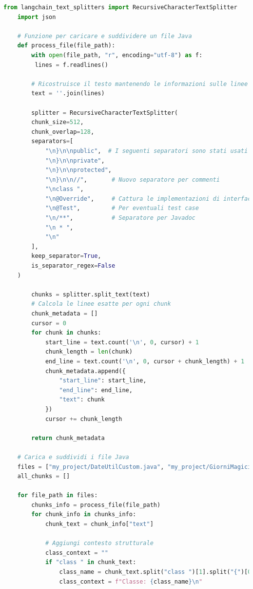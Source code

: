 \documentclass[12pt,a4paper,openright,twoside]{book}
\begin{document}
\begin{lstlisting}[language=Python, caption={Codice Python per la suddivisione dei file Java in chunk}, label={lst:chunking}]
    from langchain_text_splitters import RecursiveCharacterTextSplitter
    import json
    
    # Funzione per caricare e suddividere un file Java
    def process_file(file_path):
        with open(file_path, "r", encoding="utf-8") as f:
         lines = f.readlines()
    
        # Ricostruisce il testo mantenendo le informazioni sulle linee
        text = ''.join(lines)
    
        splitter = RecursiveCharacterTextSplitter(
        chunk_size=512,
        chunk_overlap=128,
        separators=[
            "\n}\n\npublic",  # I seguenti separatori sono stati usati per provare a mantenere i metodi uniti
            "\n}\n\nprivate",
            "\n}\n\nprotected",
            "\n}\n\n//",       # Nuovo separatore per commenti
            "\nclass ",
            "\n@Override",     # Cattura le implementazioni di interfacce
            "\n@Test",         # Per eventuali test case
            "\n/**",           # Separatore per Javadoc
            "\n * ",
            "\n"
        ],
        keep_separator=True,
        is_separator_regex=False
    )
    
        chunks = splitter.split_text(text)
        # Calcola le linee esatte per ogni chunk
        chunk_metadata = []
        cursor = 0
        for chunk in chunks:
            start_line = text.count('\n', 0, cursor) + 1
            chunk_length = len(chunk)
            end_line = text.count('\n', 0, cursor + chunk_length) + 1
            chunk_metadata.append({
                "start_line": start_line,
                "end_line": end_line,
                "text": chunk
            })
            cursor += chunk_length
        
        return chunk_metadata
    
    # Carica e suddividi i file Java
    files = ["my_project/DateUtilCustom.java", "my_project/GiorniMagici.java", "my_project/BasketballStats.java"]
    all_chunks = []
    
    for file_path in files:
        chunks_info = process_file(file_path)
        for chunk_info in chunks_info:
            chunk_text = chunk_info["text"]
            
            # Aggiungi contesto strutturale
            class_context = ""
            if "class " in chunk_text:
                class_name = chunk_text.split("class ")[1].split("{")[0].strip()
                class_context = f"Classe: {class_name}\n"
            

\end{lstlisting}
\end{document}
